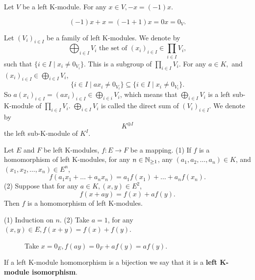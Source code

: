 \documentclass{book}
\numberwithin{equation}{section}
\begin{document}
\begin{propositionenv}
    Let $V$ be a left K-module. For any $x\in V,  -x=(-1)x$.
\end{propositionenv}
\begin{proofenv}
    $$(-1)x+x=(-1+1)x=0x=0_V.$$
\end{proofenv}
\begin{exampleenv}
    Let $(V_i)_{i\in I}$ be a family of left K-modules. We denote by 
    $$\bigoplus_{i\in I}V_i\text{ the set of }(x_i)_{i\in I}\in \prod_{i\in I}V_i, $$
    such that $\{i\in I\mid x_i\not=0_{V_i}\}$. This is a subgroup of $\prod_{i\in I}V_i$. For any $a\in K, $ and $(x_i)_{i\in I}\in \bigoplus_{i\in I}V_i$, 
    $$\{i\in I\mid ax_i\not=0_{V_i}\}\subseteq\{i\in I\mid x_i\not=0_{V_i}\}.$$
    So $\displaystyle a(x_i)_{i\in I}=(ax_i)_{i\in I}\in \bigoplus_{i\in i}V_i$,  which means that $\displaystyle\bigoplus_{i\in I}V_i$ is a left sub-K-module of $\displaystyle\prod_{i\in I}V_i$. $\displaystyle\bigoplus_{i\in I}V_i$ is called the direct sum of $(V_i)_{i\in I}$. We denote by 
    $$K^{\oplus I}$$
    the left sub-K-module of $K^I$.
\end{exampleenv}
\begin{propositionenv}
    Let $E$ and $F$ be left K-modules, $f:E\rightarrow F$ be a mapping.
    \newline
    (1) If $f$ is a homomorphism of left K-modules,  for any $n\in \mathbb{N}_{\ge1}$,  any $(a_1, a_2, \dots, a_n)\in K$,  and $(x_1, x_2, \dots, x_n)\in E^n$, 
    $$f(a_1x_1+\dots+a_nx_n)=a_1f(x_1)+\dots+a_nf(x_n).$$
    (2) Suppose that for any $a\in K, (x, y)\in E^2$, 
    $$f(x+ay)=f(x)+af(y).$$
    Then $f$ is a homomorphism of left K-modules.
\end{propositionenv}
\begin{proofenv}
    (1) Induction on $n$.
    \newline
    (2) Take $a=1$,  for any $(x, y)\in E, f(x+y)=f(x)+f(y)$. 
    
    \ \ \ \ \ \ Take $x=0_E, f(ay)=0_F+af(y)=af(y)$.
\end{proofenv}
\begin{definitionenv}
    If a left K-module homomorphism is a bijection we say that it is a \textbf{left K-module isomorphism}.
\end{definitionenv}
\end{document}
